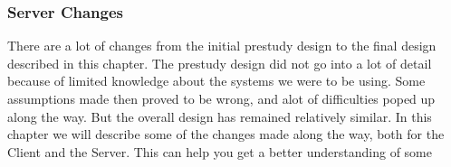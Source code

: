 \subsubsection{Server Changes}\label{Changes:Server}
    There are a lot of changes from the initial prestudy design to the final design described in this chapter. The prestudy design did not go into a lot of detail because of limited knowledge about the systems we were to be using. Some assumptions made then proved to be wrong, and alot of difficulties poped up along the way. But the overall design has remained relatively similar. In this chapter we will describe some of the changes made along the way, both for the Client and the Server. This can help you get a better understanding of some 